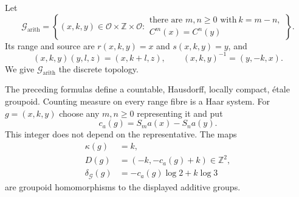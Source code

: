 \begin{definition}
\label{def:arithmetic-orbit-groupoid}
Let
\begin{equation}
\label{eq:arithmetic-orbit-groupoid}
 \mathcal G_{\mathrm{arith}}
 =\left\{(x,k,y)\in\mathcal O\times\mathbb Z\times\mathcal O:
 \begin{array}{l}
 \text{there are }m,n\geq0\text{ with}\ k=m-n,\\[-1mm]
 C^m(x)=C^n(y)
 \end{array}\right\}.
\end{equation}
Its range and source are $r(x,k,y)=x$ and $s(x,k,y)=y$, and
\[
 (x,k,y)(y,l,z)=(x,k+l,z),
 \qquad (x,k,y)^{-1}=(y,-k,x).
\]
We give $\mathcal G_{\mathrm{arith}}$ the discrete topology.
\end{definition}

\begin{theorem}
\label{thm:arithmetic-groupoid-cocycles}
The preceding formulas define a countable, Hausdorff, locally compact,
\'{e}tale groupoid.  Counting measure on every range fibre is a Haar system.
For $g=(x,k,y)$ choose any $m,n\geq0$ representing it and put
\begin{equation}
\label{eq:arithmetic-groupoid-ca}
 c_a(g)=S_ma(x)-S_na(y).
\end{equation}
This integer does not depend on the representative.  The maps
\begin{align}
 \kappa(g)&=k,\label{eq:arithmetic-groupoid-kappa}\\
 D(g)&=(-k,-c_a(g)+k)\in\mathbb Z^2,\label{eq:arithmetic-groupoid-D}\\
 \delta_{\mathcal G}(g)&=-c_a(g)\log2+k\log3\label{eq:arithmetic-groupoid-delta}
\end{align}
are groupoid homomorphisms to the displayed additive groups.
\end{theorem}

